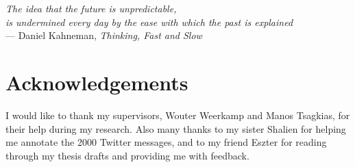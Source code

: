 

\begin{flushright}{\slshape  
The idea that the future is unpredictable,\\
is undermined every day by the ease with which the past is explained
} \\ \medskip
--- Daniel Kahneman, \textit{Thinking, Fast and Slow}
\end{flushright}

\bigskip


\begingroup

\let\clearpage\relax
\let\cleardoublepage\relax
\let\cleardoublepage\relax

\chapter*{Acknowledgements} %

I would like to thank my supervisors, Wouter Weerkamp and Manos Tsagkias, for their help during my research. Also many thanks to my sister Shalien for helping me annotate the 2000 Twitter messages, and to my friend Eszter for reading through my thesis drafts and providing me with feedback.

\endgroup
